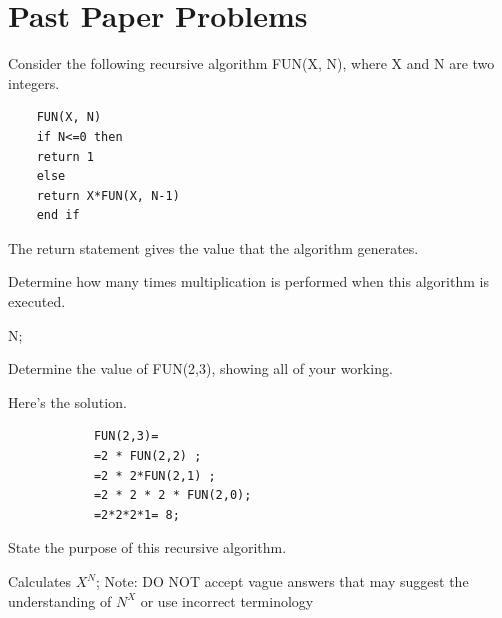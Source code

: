 \section{Past Paper Problems}

\begin{exercise*} %
Consider the following recursive algorithm FUN(X, N), where X and N are two integers.	
	\begin{verbatim}
	FUN(X, N)
	if N<=0 then
	return 1
	else
	return X*FUN(X, N-1)
	end if
	\end{verbatim}
	The return statement gives the value that the algorithm generates.
	
	\begin{parts}
		\item Determine how many times multiplication is performed when this algorithm is executed.
		\begin{solution}
			N;
		\end{solution}
		\item Determine the value of FUN(2,3), showing all of your working.
		\begin{solution}
			Here's the solution.
			\begin{verbatim}
			FUN(2,3)=
			=2 * FUN(2,2) ;
			=2 * 2*FUN(2,1) ;
			=2 * 2 * 2 * FUN(2,0);
			=2*2*2*1= 8;
			\end{verbatim}
		\end{solution}
		\item State the purpose of this recursive algorithm.
		\begin{solution}
			Calculates $X^N$; Note: DO NOT accept vague answers that may suggest the understanding of $N^X$ or use incorrect terminology
		\end{solution}
	\end{parts}
\end{exercise*}




